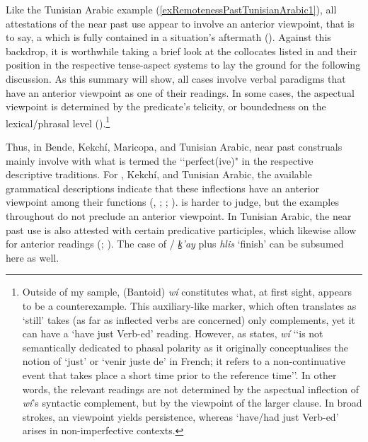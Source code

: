 \largerpage[2.25]
Like the Tunisian Arabic example (\ref{exRemotenessPastTunisianArabic1}), all attestations of the near past use appear to involve an anterior viewpoint, that is to say, a  which is fully contained in a situation's aftermath (). Against this backdrop, it is worthwhile taking a brief look at the collocates listed in  and their position in the respective tense-aspect systems to lay the ground for the following discussion. As this summary will show, all cases involve verbal paradigms that have an anterior viewpoint as one of their readings. In some cases, the aspectual viewpoint is determined by the predicate's telicity, or boundedness on the lexical/phrasal level ().{\footnote{Outside of my sample,  (Bantoid) \textit{wí} constitutes what, at first sight, appears to be a counterexample. This auxiliary-like marker, which often translates as \lq still\rq{ }takes (as far as inflected verbs are concerned) only  complements, yet it can have a \lq have just Verb-ed\rq{ }reading. However, as \textcite[220]{Mekamgoum2021} states, \textit{wí} \lq\lq is not semantically dedicated to phasal polarity as it originally conceptualises the notion of \lq just\rq{ }or \lq{}venir juste de\rq{ }in French; it refers to a non-continuative event that takes place a short time prior to the reference time\rq\rq{}. In other words, the relevant readings are not determined by the aspectual inflection of \textit{wí}'s syntactic complement, but by the viewpoint of the larger clause. In broad strokes, an  viewpoint yields persistence, whereas \lq have/had just Verb-ed\rq{ }arises in non-imperfective contexts.}}

Thus, in Bende, Kekchí, Maricopa, and Tunisian Arabic, near past construals mainly involve with what is termed the \lq\lq perfect(ive)" in the respective descriptive traditions. For , Kekchí, and Tunisian Arabic, the available grammatical descriptions indicate that these inflections have an anterior viewpoint among their functions (\cite[92–95]{Kockelman2010}, \citeyear{Kockelman2020}; \cite[s.v. \textit{F10 Sí-bhendé, Sí-tóngwé}]{NurseData}; \cite[298–300]{Singer1984}).  is harder to judge, but the examples throughout \textcite{Gordon1986} do not preclude an anterior viewpoint. In Tunisian Arabic, the near past use is also attested with certain predicative participles, which likewise allow for anterior readings (\cite[293]{RittBenmimoun2014}; \cite[303–308]{Singer1984}). The case of / \textit{k̠'ay} plus \textit{hlis} \lq finish' can be subsumed here as well.

